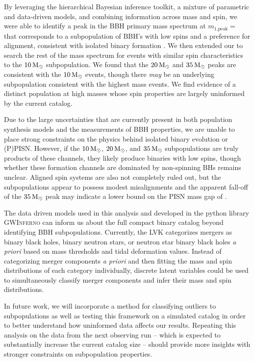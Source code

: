 By leveraging the hierarchical Bayesian inference toolkit, a mixture of parametric and data-driven models, and combining information across mass and spin, we were able to identify a peak in the BBH primary mass spectrum at $m_\text{1,peak} = $ \result{$\CIPlusMinus{\macros[Mass][Base][PeakA][max]}$ \msun} that corresponds to a subpopulation of BBH's with low spins and a preference for alignment, consistent with isolated binary formation . We then extended our \base{} to search the rest of the mass spectrum for events with similar spin characteristics to the $10{\,\rm M}_\odot$ subpopulation. We found that the $20{\,\rm M}_\odot$ and $35{\,\rm M}_\odot$ peaks are consistent with the $10{\,\rm M}_\odot$ events, though there \textit{may} be an underlying subpopulation consistent with the highest mass events. We find evidence of a distinct population at high masses whose spin properties are largely uninformed by the current catalog.

Due to the large uncertainties that are currently present in both population synthesis models and the measurements of BBH properties, we are unable to place strong constraints on the physics behind isolated binary evolution or (P)PISN. However, if the $10{\,\rm M}_\odot$, $20{\,\rm M}_\odot$, and $35{\,\rm M}_\odot$ subpopulations are truly products of these channels, they likely produce binaries with low spins, though whether these formation channels are dominated by non-spinning BHs remains unclear. Aligned spin systems are also not completely ruled out, but the subpopulations appear to possess modest misalignments and the apparent fall-off of the $35{\,\rm M}_\odot$ peak may indicate a lower bound on the PISN mass gap of \result{$\CIPlusMinus{\macros[Mass][Composite][ContinuumA][99percentile]}$ \msun}.

The data driven models used in this analysis and developed in the python library \textsc{GWInferno} can inform us about the full compact binary catalog beyond identifying BBH subpopulations. Currently, the LVK categorizes mergers as binary black holes, binary neutron stars, or neutron star binary black holes \emph{a priori} based on mass thresholds and tidal deformation values. Instead of categorizing merger components \emph{a priori} and then fitting the mass and spin distributions of each category individually, discrete latent variables could be used to simultaneously classify merger components and infer their mass and spin distributions.

In future work, we will incorporate a method for classifying outliers to subpopulations as well as testing this framework on a simulated catalog in order to better understand how uninformed data affects our results. Repeating this analysis on the data from the next observing run -- which is expected to substantially increase the current catalog size -- should provide more insights with stronger constraints on subpopulation properties.
